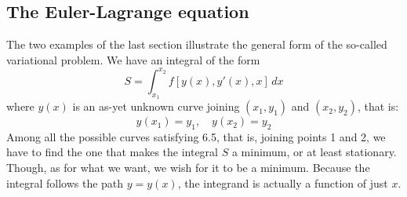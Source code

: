 \subsection{The Euler-Lagrange equation}
The two examples of the last section illustrate the general form of the so-called variational problem. We have an integral of the form $$S=\int _{x_{1}}^{x_{2}}f[y(x),y'(x),x] \, dx $$
where $y(x)$ is an as-yet unknown curve joining $(x_{1},y_{1})$ and $(x_{2},y_{2})$, that is: $$y(x_{1})=y_{1},\quad y(x_{2})=y_{2}$$
Among all the possible curves satisfying 6.5, that is, joining points 1 and 2, we have to find the one that makes the integral $S$ a minimum, or at least stationary. Though, as for what we want, we wish for it to be a minimum. Because the integral follows the path $y=y(x)$, the integrand is actually a function of just $x$. 

